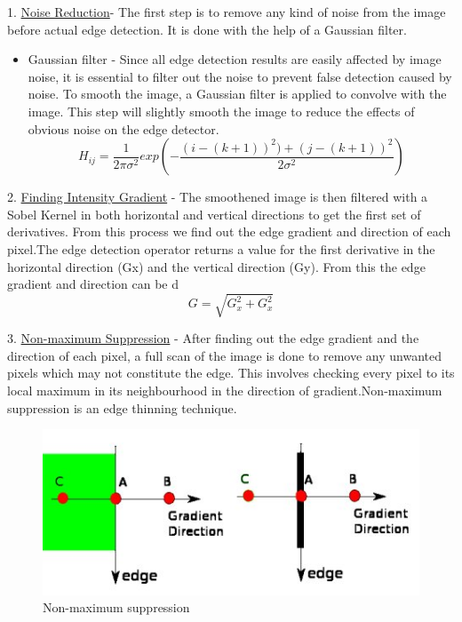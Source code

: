 \documentclass[BTech]{srmuthesis}
\begin{document}
1. \underline{Noise Reduction}- The first step is to remove  any kind of noise from the image before actual edge detection. It is done with the help of a Gaussian filter.
\begin{itemize}
\item Gaussian filter - Since all edge detection results are easily affected by image noise, it is essential to filter out the noise to prevent false detection caused by noise. To smooth the image, a Gaussian filter is applied to convolve with the image. This step will slightly smooth the image to reduce the effects of obvious noise on the edge detector.
\begin{equation}
H_{ij}=\frac{1}{2\pi\sigma^2}exp(-\frac{(i-(k+1))^2)+(j-(k+1))^2}{2\sigma^2})
\label{eq:mkceqn}
\end{equation} 
\end{itemize}

2. \underline{Finding Intensity Gradient} - The smoothened
image is then filtered with a Sobel Kernel in both horizontal and vertical directions to get the first set of derivatives. From this process we find out the edge gradient and direction of each pixel.The edge detection operator returns a value for the first derivative in the horizontal direction (Gx) and the vertical direction (Gy). From this the edge gradient and direction can be d\begin{equation}
G=\sqrt{G_{x}^2+G_{x}^2}
\label{eg:mkceqn}
\end{equation}


3. \underline{Non-maximum Suppression} - After finding out the edge gradient and the direction of each pixel, a full scan of the image is done to remove any unwanted pixels which may not constitute the edge. This involves checking every pixel to its local maximum in its neighbourhood in the direction of gradient.Non-maximum suppression is an edge thinning technique.

\begin{figure}[h!]
    \centering
    \includegraphics[width=10cm\textwidth]{nms}
    \caption{Non-maximum suppression}
    \label{fig:Non-maximum suppression}
\end{figure}
\end{document}
